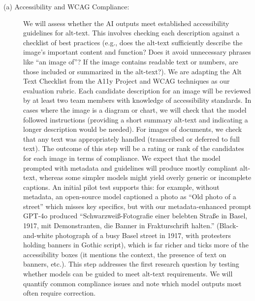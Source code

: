 \documentclass{anthology-ch}         %
\begin{document}
\begin{description}
\item[(a) Accessibility and WCAG Compliance:] We will assess whether the AI outputs meet established accessibility guidelines for alt-text. This involves checking each description against a checklist of best practices (e.g., does the alt-text sufficiently describe the image’s important content and function? Does it avoid unnecessary phrases like ``an image of''? If the image contains readable text or numbers, are those included or summarized in the alt-text?). We are adapting the Alt Text Checklist from the A11y Project and WCAG techniques as our evaluation rubric. Each candidate description for an image will be reviewed by at least two team members with knowledge of accessibility standards. In cases where the image is a diagram or chart, we will check that the model followed instructions (providing a short summary alt-text and indicating a longer description would be needed). For images of documents, we check that any text was appropriately handled (transcribed or deferred to full text). The outcome of this step will be a rating or rank of the candidates for each image in terms of compliance. We expect that the model prompted with metadata and guidelines will produce mostly compliant alt-text, whereas some simpler models might yield overly generic or incomplete captions. An initial pilot test supports this: for example, without metadata, an open-source model captioned a photo as ``Old photo of a street'' which misses key specifics, but with our metadata-enhanced prompt GPT-4o produced ``Schwarzweiß-Fotografie einer belebten Straße in Basel, 1917, mit Demonstranten, die Banner in Frakturschrift halten.'' (Black-and-white photograph of a busy Basel street in 1917, with protesters holding banners in Gothic script), which is far richer and ticks more of the accessibility boxes (it mentions the context, the presence of text on banners, etc.). This step addresses the first research question by testing whether models can be guided to meet alt-text requirements. We will quantify common compliance issues and note which model outputs most often require correction.


\end{description}
\end{document}
